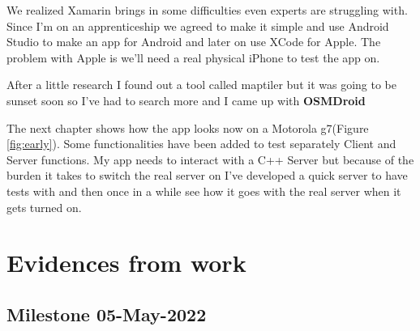 \documentclass[a4paper,12pt]{book}
\begin{document}
We realized Xamarin brings in some difficulties even experts are struggling with. Since I'm on an apprenticeship we agreed to make it simple and use Android Studio to make an app for Android and later on use XCode for Apple. The problem with Apple is we'll need a real physical iPhone to test the app on.

After a little research I found out a tool called maptiler but it was going to be sunset soon so I've had to search more and I came up with \textbf{OSMDroid}

\bigskip
\bigskip

\scalebox{2}The next chapter shows how the app looks now on a Motorola g7(Figure \ref{fig:early}). Some functionalities have been added to test separately Client and Server functions. My app needs to interact with a C++ Server but because of the burden it takes to switch the real server on I've developed a quick server to have tests with and then once in a while see how it goes with the real server when it gets turned on.



\chapter{Evidences from work}




\bigskip
\bigskip
\bigskip
\medskip
\medskip
\section{\scalebox{1.5}Milestone 05-May-2022}
\end{document}
